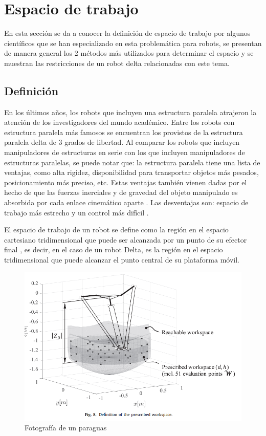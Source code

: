     \newpage

\section{Espacio de trabajo}

En esta sección se da a conocer la definición de espacio de trabajo por algunos científicos que se han especializado en esta problemática para robots, se presentan de manera general los 2 métodos más utilizados para determinar el espacio y se muestran las restricciones de un robot delta relacionadas con este tema.

    \subsection{Definición}
    En los últimos años, los robots que incluyen una estructura paralela atrajeron la atención de los investigadores del mundo académico. Entre los robots con estructura paralela más famosos se encuentran los provistos de la estructura paralela delta de 3 grados de libertad.  Al comparar los robots que incluyen manipuladores de estructuras en serie con los que incluyen manipuladores de estructuras paralelas, se puede notar que: la estructura paralela tiene una lista de ventajas, como alta rigidez, disponibilidad para transportar objetos más pesados, posicionamiento más preciso, etc. Estas ventajas también vienen dadas por el hecho de que las fuerzas inerciales y de gravedad del objeto manipulado es absorbida por cada enlace cinemático aparte \cite{Laribi08}\cite{DASH2005776}. Las desventajas son: espacio de trabajo más estrecho y un control más difícil \cite{DASH2005776}.  
    
    El espacio de trabajo de un robot se define como la región en el espacio cartesiano tridimensional que puede ser alcanzada por un punto de su efector final \cite{LARIBI2007859}, es decir, en el caso de un robot Delta, es la región en el espacio tridimensional que puede alcanzar el punto central de su plataforma móvil. 
    
    \begin{figure}[htb]
        \centering
        \includegraphics[width=0.7\linewidth]{Main/Chapter4/Images4/cap4_ws_1.png}
        \caption{Fotografía de un paraguas}
        \label{f:Cap4_ws_1}
    \end{figure}  
    
